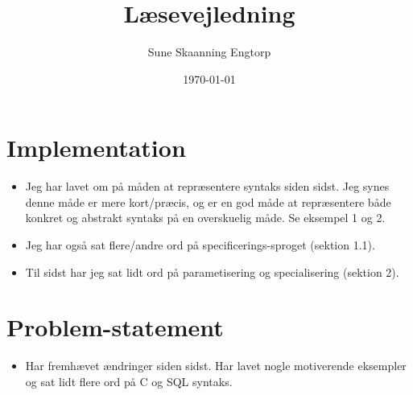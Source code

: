 \documentclass{article}
\title{Læsevejledning}
\date{\today}
\author{Sune Skaanning Engtorp}
\begin{document}
\maketitle

\section{Implementation}
\begin{itemize}
    \item Jeg har lavet om på måden at repræsentere syntaks siden sidst. Jeg synes denne måde er mere kort/præcis, og er en god måde at repræsentere både konkret og abstrakt syntaks på en overskuelig måde. Se eksempel 1 og 2.
    \item Jeg har også sat flere/andre ord på specificerings-sproget (sektion 1.1).  
    \item Til sidst har jeg sat lidt ord på parametisering og specialisering (sektion 2).
\end{itemize}

\section{Problem-statement}
\begin{itemize}
    \item Har fremhævet ændringer siden sidst. Har lavet nogle motiverende eksempler og sat lidt flere ord på C og SQL syntaks. 
\end{itemize}
\end{document}
